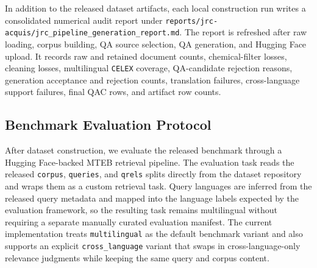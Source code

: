 In addition to the released dataset artifacts, each local construction run writes a consolidated numerical audit report under \texttt{reports/jrc-acquis/jrc\_pipeline\_generation\_report.md}. The report is refreshed after raw loading, corpus building, QA source selection, QA generation, and Hugging Face upload. It records raw and retained document counts, chemical-filter losses, cleaning losses, multilingual \texttt{CELEX} coverage, QA-candidate rejection reasons, generation acceptance and rejection counts, translation failures, cross-language support failures, final QAC rows, and artifact row counts.

\subsection{Benchmark Evaluation Protocol}

After dataset construction, we evaluate the released benchmark through a Hugging Face-backed MTEB retrieval pipeline. The evaluation task reads the released \texttt{corpus}, \texttt{queries}, and \texttt{qrels} splits directly from the dataset repository and wraps them as a custom retrieval task. Query languages are inferred from the released query metadata and mapped into the language labels expected by the evaluation framework, so the resulting task remains multilingual without requiring a separate manually curated evaluation manifest. The current implementation treats \texttt{multilingual} as the default benchmark variant and also supports an explicit \texttt{cross\_language} variant that swaps in cross-language-only relevance judgments while keeping the same query and corpus content.

